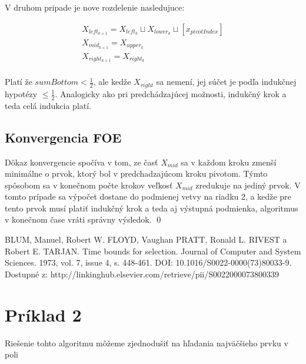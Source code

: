 \documentclass[paper=a4, fontsize=11pt]{scrartcl} %
\numberwithin{equation}{section} %
\numberwithin{figure}{section} %
\numberwithin{table}{section} %
\begin{document}
V druhom pripade je nove rozdelenie nasledujuce:

\begin{equation}
    \begin{aligned}
        X_{left_{k+1}} = X_{left_k} \sqcup  X_{lower_k} \sqcup [x_{pivotIndex}] \\
        X_{mid_{k+1}} = X_{upper_k} \\
        X_{right_{k+1}} = X_{right_k} \\
    \end{aligned}
\end{equation}

Platí že $sumBottom < \frac{1}{2}$, ale kedže $X_{right}$ sa nemení, jej súčet je podľa indukčnej hypotézy $\leq \frac{1}{2}$.
Analogicky ako pri predchádzajúcej možnosti, indukčný krok a teda celá indukcia platí.

\subsection*{Konvergencia FOE}
Dôkaz konvergencie spočíva v tom, ze časť $X_{mid}$ sa v každom kroku zmenší minimálne o prvok, ktorý bol v predchadzajúcom kroku pivotom. Týmto spôsobom sa v konečnom počte krokov veľkosť $X_{mid}$ zredukuje na jediný prvok. V tomto prípade sa výpočet dostane do podmienej vetvy na riadku 2, a kedže pre tento prvok musí platiť indukčný krok a teda aj výstupná podmienka, algoritmus v konečnom čase vráti správny výsledok. \qed

\begin{thebibliography}{1}
 BLUM, Manuel, Robert W. FLOYD, Vaughan PRATT, Ronald L. RIVEST a Robert E. TARJAN.
Time bounds for selection.
Journal of Computer and System Sciences. 1973, vol. 7, issue 4, s. 448-461.
DOI: 10.1016/S0022-0000(73)80033-9.
Dostupné z: http://linkinghub.elsevier.com/retrieve/pii/S0022000073800339
\end{thebibliography}

\pagebreak

\section*{Príklad 2}

Riešenie tohto algoritmu môžeme zjednodušiť na hľadania najväčšieho prvku v poli
\end{document}
